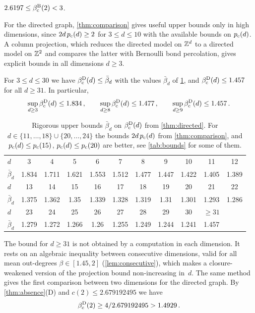 \documentclass[11pt,letterpaper]{article}
\begin{document}
\begin{theorem}\label{thm:planar}
$2.6197\le\beta_{\mathrm c}^{\mathrm B}(2)<3$.
\end{theorem}

For the directed graph, \cref{thm:comparison} gives useful upper bounds only in high dimensions, since $2d\,p_{\mathrm c}(d)\ge2$ for $3\le d\le10$ with the available bounds on $p_{\mathrm c}(d)$. A column projection, which reduces the directed model on $\mathbb Z^d$ to a directed model on $\mathbb Z^2$ and compares the latter with Bernoulli bond percolation, gives explicit bounds in all dimensions $d\ge3$.

\begin{theorem}\label{thm:directed}
For $3\le d\le30$ we have $\beta_{\mathrm c}^{\mathrm D}(d)\le\bar\beta_d$ with the values $\bar\beta_d$ of \cref{tab:directed}, and $\beta_{\mathrm c}^{\mathrm D}(d)\le1.457$ for all $d\ge31$. In particular,
\begin{equation*}
\sup_{d\ge3}\beta_{\mathrm c}^{\mathrm D}(d)\le1.834\,,\qquad\sup_{d\ge8}\beta_{\mathrm c}^{\mathrm D}(d)\le1.477\,,\qquad\sup_{d\ge9}\beta_{\mathrm c}^{\mathrm D}(d)\le1.457\,.
\end{equation*}
\end{theorem}

\begin{table}[ht]
\centering\small
\setlength{\tabcolsep}{4pt}
\begin{tabular}{l*{10}{c}}
\toprule
$d$ & 3 & 4 & 5 & 6 & 7 & 8 & 9 & 10 & 11 & 12\\
$\bar\beta_d$ & 1.834 & 1.711 & 1.621 & 1.553 & 1.512 & 1.477 & 1.447 & 1.422 & 1.405 & 1.389\\
\midrule
$d$ & 13 & 14 & 15 & 16 & 17 & 18 & 19 & 20 & 21 & 22\\
$\bar\beta_d$ & 1.375 & 1.362 & 1.35 & 1.339 & 1.328 & 1.319 & 1.31 & 1.301 & 1.293 & 1.286\\
\midrule
$d$ & 23 & 24 & 25 & 26 & 27 & 28 & 29 & 30 & ${\ge}31$ & \\
$\bar\beta_d$ & 1.279 & 1.272 & 1.266 & 1.26 & 1.255 & 1.249 & 1.244 & 1.241 & 1.457 & \\
\bottomrule
\end{tabular}
\caption{Rigorous upper bounds $\bar\beta_d$ on $\beta_{\mathrm c}^{\mathrm D}(d)$ from \cref{thm:directed}. For $d\in\{11,\dots,18\}\cup\{20,\dots,24\}$ the bounds $2d\,p_{\mathrm c}(d)$ from \cref{thm:comparison}, \cite[Theorem~1.2]{FvdH17} and $p_{\mathrm c}(d)\le p_{\mathrm c}(15)$, $p_{\mathrm c}(d)\le p_{\mathrm c}(20)$ are better, see \cref{tab:bounds} for some of them.}\label{tab:directed}
\end{table}

The bound for $d\ge31$ is not obtained by a computation in each dimension. It rests on an algebraic inequality between consecutive dimensions, valid for all mean out-degrees $\beta\in[1.45,2]$ (\cref{lem:consecutive}), which makes a closure-weakened version of the projection bound non-increasing in~$d$. The same method gives the first comparison between two dimensions for the directed graph. By \cref{thm:absence}(D) and $c(2)\le2.679192495$ \cite{PT00} we have
\begin{equation}\label{eq:L2}
\beta_{\mathrm c}^{\mathrm D}(2)\ge4/2.679192495>1.4929\,.
\end{equation}
\end{document}
